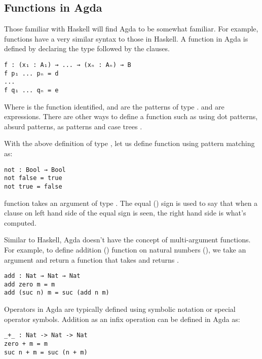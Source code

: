 \subsection{Functions in Agda}
Those familiar with Haskell will find Agda to be somewhat familiar. For example,
functions have a very similar syntax to those in Haskell. A function in Agda is
defined by declaring the type followed by the clauses.

\begin{verbatim}
f : (x₁ : A₁) → ... → (xₙ : Aₙ) → B
f p₁ ... pₙ = d
...
f q₁ ... qₙ = e
\end{verbatim} 

Where  is the function identified,  and  are the
patterns of type .  and  are expressions. There
are other ways to define a function such as using dot patterns, absurd patterns,
as patterns and case trees \cite{10.1007/978-3-642-03359-9_6}.

With the above definition of type , let us define  
function using pattern matching as:

\begin{verbatim}
not : Bool → Bool
not false = true
not true = false
\end{verbatim} 

 function takes an argument of type . The equal
(\inline{=}) sign is used to say that when a clause on left hand side of the
equal sign is seen, the right hand side is what's computed.  

Similar to Haskell, Agda doesn't have the concept of multi-argument functions.
For example, to define addition () function on natural numbers
(), we take an argument  and return a function that
takes  and returns .

\begin{verbatim}
add : Nat → Nat → Nat
add zero m = m
add (suc n) m = suc (add n m)
\end{verbatim}

Operators in Agda are typically defined using symbolic notation or special
operator symbols. Addition as an infix operation can be defined in Agda as:

\label{code:Add}
\begin{verbatim}
_+_ : Nat -> Nat -> Nat
zero + m = m
suc n + m = suc (n + m)
\end{verbatim}

